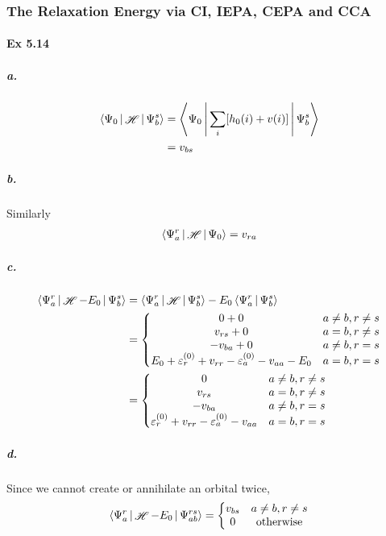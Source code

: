 \documentclass[a4paper]{article}
\DeclareMathOperator{\sH}{\mathscr{H}}
\newcommand{\ex}[1]{\paragraph{Ex #1}}
\newcommand{\subex}[1]{\subparagraph{#1}}
\numberwithin{equation}{subsection}
\begin{document}
\subsubsection{The Relaxation Energy via CI, IEPA, CEPA and CCA}
\ex{5.14}
\subex{a.}
\begin{align}
\Braket{\Psi_0 | \sH | \Psi_b^s} &= \Braket{\Psi_0 | \sum_i [h_0(i) + v(i)] | \Psi_b^s} \notag\\
&= v_{bs}
\end{align}
\subex{b.}
Similarly
\begin{align}
\Braket{\Psi_a^r | \sH | \Psi_0} = v_{ra}
\end{align}
\subex{c.}
\begin{align}
\Braket{\Psi_a^r | \sH - E_0 | \Psi_b^s} 
&= \Braket{\Psi_a^r | \sH | \Psi_b^s} - E_0\Braket{\Psi_a^r | \Psi_b^s} \notag\\
&= \left\{\mqty{
	0 + 0 & a\neq b, r\neq s\\
	v_{rs} + 0 & a=b, r\neq s\\
	-v_{ba} + 0 & a\neq b, r=s\\
	E_0 + \varepsilon_r^{(0)} + v_{rr} - \varepsilon_a^{(0)} - v_{aa} - E_0 & a=b, r=s
}\right. \notag\\
&= \left\{\mqty{
	0  & a\neq b, r\neq s\\
	v_{rs}  & a=b, r\neq s\\
	-v_{ba}  & a\neq b, r=s\\
	\varepsilon_r^{(0)} + v_{rr} - \varepsilon_a^{(0)} - v_{aa} & a=b, r=s
}\right.
\end{align}
\subex{d.}
Since we cannot create or annihilate an orbital twice,
\begin{align}
\Braket{\Psi_a^r | \sH - E_0 | \Psi_{ab}^{rs}} = 
\left\{\mqty{
	v_{bs} & a\neq b, r\neq s\\
	0 & \text{otherwise}
}\right.
\end{align}


\end{document}
